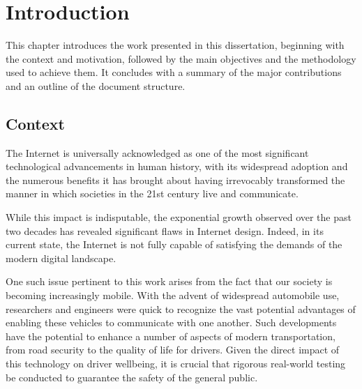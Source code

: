 
%

\chapter{Introduction}
\label{cha:introduction}

This chapter introduces the work presented in this dissertation, beginning with the context and motivation, followed by the main objectives and the methodology used to achieve them. It concludes with a summary of the major contributions and an outline of the document structure.

\section{Context} %
\label{sec:contex}



The Internet is universally acknowledged as one of the most significant technological advancements in human history, with its widespread adoption and the numerous benefits it has brought about having irrevocably transformed the manner in which societies in the 21st century live and communicate.

While this impact is indisputable, the exponential growth observed over the past two decades has revealed significant flaws in Internet design. Indeed, in its current state, the Internet is not fully capable of satisfying the demands of the modern digital landscape. 

One such issue pertinent to this work arises from the fact that our society is becoming increasingly mobile. With the advent of widespread automobile use, researchers and engineers were quick to recognize the vast potential advantages of enabling these vehicles to communicate with one another. Such developments have the potential to enhance a number of aspects of modern transportation, from road security to the quality of life for drivers.
Given the direct impact of this technology on driver wellbeing, it is crucial that rigorous real-world testing be conducted to guarantee the safety of the general public.

